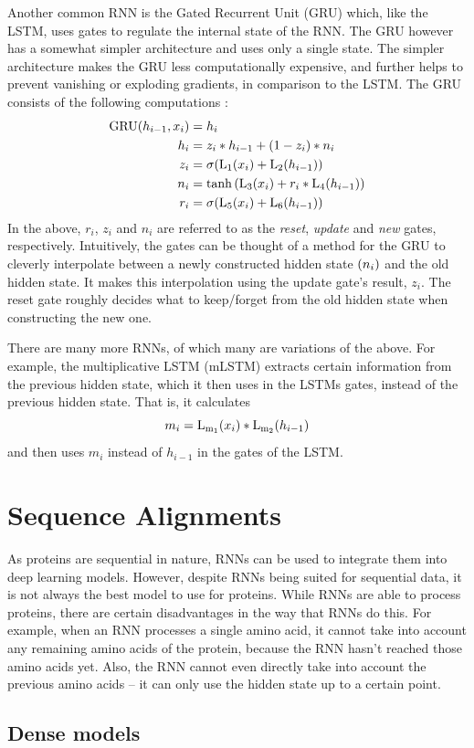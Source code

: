 Another common RNN is the Gated Recurrent Unit (GRU) which, like the LSTM, uses gates to regulate the internal state of the RNN. The GRU however has a somewhat simpler architecture and uses only a single state. The simpler architecture makes the GRU less computationally expensive, and further helps to prevent vanishing or exploding gradients, in comparison to the LSTM. The GRU consists of the following computations \cite{pytorchnn}:
\begin{align*}
    \mathrm{GRU}{\mathopen{} \left( h_{i - 1}, x_i \right) \mathclose{}} &= h_i \\
    h_i &= z_i * h_{i - 1} + {\mathopen{} \left( 1 - z_i \right) \mathclose{}} * n_i  \\
    z_i &= \mathrm{\sigma}{\mathopen{} \left( \mathrm{L_1}{\mathopen{} \left( x_i \right) \mathclose{}} + \mathrm{L_2}{\mathopen{} \left( h_{i - 1} \right) \mathclose{}} \right) \mathclose{}} \\
    n_i &= \tanh{\mathopen{} \left( \mathrm{L_3}{\mathopen{} \left( x_i \right) \mathclose{}} + r_i * \mathrm{L_4}{\mathopen{} \left( h_{i - 1} \right) \mathclose{}} \right) \mathclose{}} \\
    r_i &= \mathrm{\sigma}{\mathopen{} \left( \mathrm{L_5}{\mathopen{} \left( x_i \right) \mathclose{}} + \mathrm{L_6}{\mathopen{} \left( h_{i - 1} \right) \mathclose{}} \right) \mathclose{}}
\end{align*}
In the above, $r_i$, $z_i$ and $n_i$ are referred to as the \textit{reset}, \textit{update} and \textit{new} gates, respectively. Intuitively, the gates can be thought of a method for the GRU to cleverly interpolate between a newly constructed hidden state ${\mathopen{} \left( n_i \right) \mathclose{}}$ and the old hidden state. It makes this interpolation using the update gate's result, $z_i$. The reset gate roughly decides what to keep/forget from the old hidden state when constructing the new one.

There are many more RNNs, of which many are variations of the above. For example, the multiplicative LSTM (mLSTM) \cite{krause2016multiplicative} extracts certain information from the previous hidden state, which it then uses in the LSTMs gates, instead of the previous hidden state. That is, it calculates
\[m_i = \mathrm{L_{m_1}}{\mathopen{} \left( x_i \right) \mathclose{}} * \mathrm{L_{m_2}}{\mathopen{} \left( h_{i - 1} \right) \mathclose{}}\]
and then uses $m_i$ instead of $h_{i - 1}$ in the gates of the LSTM.

\section{Sequence Alignments}
\label{sec:sequence_alignments}
As proteins are sequential in nature, RNNs can be used to integrate them into deep learning models. However, despite RNNs being suited for sequential data, it is not always the best model to use for proteins. While RNNs are able to process proteins, there are certain disadvantages in the way that RNNs do this. For example, when an RNN processes a single amino acid, it cannot take into account any remaining amino acids of the protein, because the RNN hasn't reached those amino acids yet. Also, the RNN cannot even directly take into account the previous amino acids -- it can only use the hidden state up to a certain point.

\subsection{Dense models}
